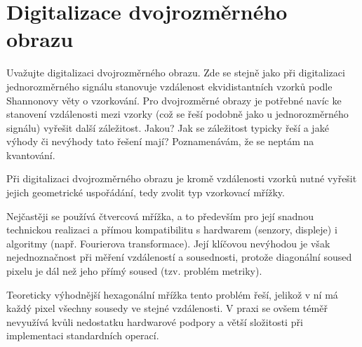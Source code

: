 \section{Digitalizace dvojrozměrného obrazu}
Uvažujte digitalizaci dvojrozměrného obrazu. Zde se stejně jako při digitalizaci jednorozměrného signálu 
stanovuje vzdálenost ekvidistantních vzorků podle Shannonovy věty o vzorkování. Pro dvojrozměrné obrazy je potřebné 
navíc ke stanovení vzdálenosti mezi vzorky (což se řeší podobně jako u jednorozměrného signálu) vyřešit další 
záležitost. Jakou? Jak se záležitost typicky řeší a jaké výhody či nevýhody tato řešení mají? Poznamenávám, že se neptám 
na kvantování.

Při digitalizaci dvojrozměrného obrazu je kromě vzdálenosti vzorků nutné vyřešit jejich geometrické uspořádání, tedy 
zvolit typ vzorkovací mřížky.

Nejčastěji se používá čtvercová mřížka, a to především pro její snadnou technickou realizaci a přímou kompatibilitu s 
hardwarem (senzory, displeje) i algoritmy (např. Fourierova transformace). Její klíčovou nevýhodou je však 
nejednoznačnost při měření vzdáleností a sousednosti, protože diagonální soused pixelu je dál než jeho přímý soused 
(tzv. problém metriky).

Teoreticky výhodnější hexagonální mřížka tento problém řeší, jelikož v ní má každý pixel všechny sousedy ve stejné 
vzdálenosti. V praxi se ovšem téměř nevyužívá kvůli nedostatku hardwarové podpory a větší složitosti při implementaci 
standardních operací.